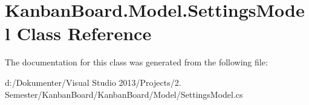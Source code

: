 \hypertarget{class_kanban_board_1_1_model_1_1_settings_model}{}\section{Kanban\+Board.\+Model.\+Settings\+Model Class Reference}
\label{class_kanban_board_1_1_model_1_1_settings_model}


The documentation for this class was generated from the following file\+:\begin{DoxyCompactItemize}
\item 
d\+:/\+Dokumenter/\+Visual Studio 2013/\+Projects/2. Semester/\+Kanban\+Board/\+Kanban\+Board/\+Model/Settings\+Model.\+cs\end{DoxyCompactItemize}
